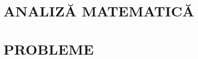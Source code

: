 

\renewcommand{\titluserie}{Analiză pentru Olimpiadă}
\renewcommand{\numarvolum}{1}
\renewcommand{\titluvolum}{clasa a XI-a}
\renewcommand{\subtitluvolum}{Șiruri, limite, continuitate, derivabilitate}
\renewcommand{\despreacestvolum}{Cuprinde analiza matematică de clasa a XI-a (șiruri, limite, continuitate, derivabilitate), împreună cu puntea spre clasa a XII-a.}
\renewcommand{\celelaltevolume}{analizei de clasa a XII-a, algebrei liniare și algebrei abstracte}





\clearpage\color{ink}
\part{ANALIZĂ MATEMATICĂ}




\clearpage
\part{PROBLEME}
\lhead{\small\textcolor{grey}{Probleme de analiză}}
\nopagebreak
{}





